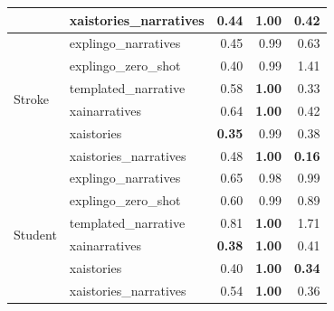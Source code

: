\begin{table}[h!]
\begin{tabular}{llrrr}
 & xaistories_narratives & 0.44 & \textbf{1.00} & 0.42 \\
\midrule
\multirow{6}{*}{Stroke} & explingo_narratives & 0.45 & 0.99 & 0.63 \\
 & explingo_zero_shot & 0.40 & 0.99 & 1.41 \\
 & templated_narrative & 0.58 & \textbf{1.00} & 0.33 \\
 & xainarratives & 0.64 & \textbf{1.00} & 0.42 \\
 & xaistories & \textbf{0.35} & 0.99 & 0.38 \\
 & xaistories_narratives & 0.48 & \textbf{1.00} & \textbf{0.16} \\
\midrule
\multirow{6}{*}{Student} & explingo_narratives & 0.65 & 0.98 & 0.99 \\
 & explingo_zero_shot & 0.60 & 0.99 & 0.89 \\
 & templated_narrative & 0.81 & \textbf{1.00} & 1.71 \\
 & xainarratives & \textbf{0.38} & \textbf{1.00} & 0.41 \\
 & xaistories & 0.40 & \textbf{1.00} & \textbf{0.34} \\
 & xaistories_narratives & 0.54 & \textbf{1.00} & 0.36 \\
\bottomrule
\end{tabular}
\end{table}
